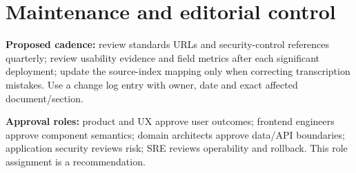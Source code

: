 \documentclass[11pt]{article}
\begin{document}
\section{Maintenance and editorial control}

\textbf{Proposed cadence:} review standards URLs and security-control references quarterly; review usability evidence and field metrics after each significant deployment; update the source-index mapping only when correcting transcription mistakes. Use a change log entry with owner, date and exact affected document/section.

\textbf{Approval roles:} product and UX approve user outcomes; frontend engineers approve component semantics; domain architects approve data/API boundaries; application security reviews risk; SRE reviews operability and rollback. This role assignment is a recommendation.


\clearpage

\end{document}
